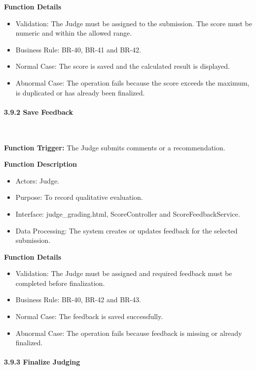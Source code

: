 \textbf{Function Details}
\begin{itemize}[leftmargin=1.5em, nosep]
    \item Validation: The Judge must be assigned to the submission. The score must be numeric and within the allowed range.
    \item Business Rule: BR-40, BR-41 and BR-42.
    \item Normal Case: The score is saved and the calculated result is displayed.
    \item Abnormal Case: The operation fails because the score exceeds the maximum, is duplicated or has already been finalized.
\end{itemize}

\paragraph*{3.9.2 Save Feedback}\leavevmode\\[-0.5em]
\label{par:save-feedback}

\textbf{Function Trigger:} The Judge submits comments or a recommendation.

\textbf{Function Description}
\begin{itemize}[leftmargin=1.5em, nosep]
    \item Actors: Judge.
    \item Purpose: To record qualitative evaluation.
    \item Interface: judge\_grading.html, ScoreController and ScoreFeedbackService.
    \item Data Processing: The system creates or updates feedback for the selected submission.
\end{itemize}

\textbf{Function Details}
\begin{itemize}[leftmargin=1.5em, nosep]
    \item Validation: The Judge must be assigned and required feedback must be completed before finalization.
    \item Business Rule: BR-40, BR-42 and BR-43.
    \item Normal Case: The feedback is saved successfully.
    \item Abnormal Case: The operation fails because feedback is missing or already finalized.
\end{itemize}

\paragraph*{3.9.3 Finalize Judging}\leavevmode\\[-0.5em]
\label{par:finalize-judging}

